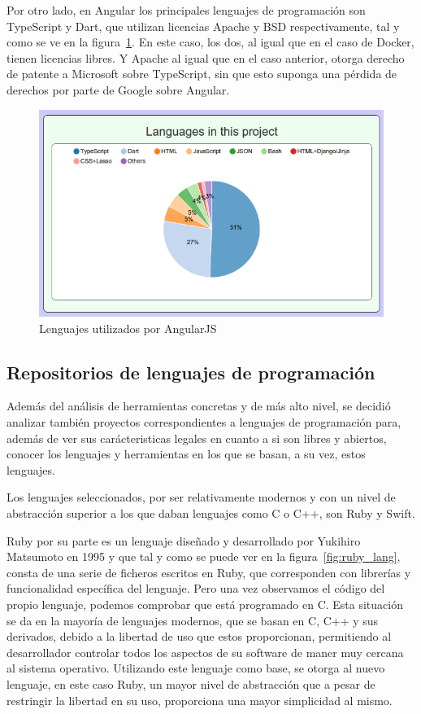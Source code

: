 \documentclass[a4paper, spanish, 12pt]{book}
\begin{document}
Por otro lado, en Angular los principales lenguajes de programaci\'on son TypeScript y Dart, que utilizan licencias Apache
y BSD respectivamente, tal y como se ve en la figura~\ref{fig:angular_lang}. En este caso, los dos, al igual que en el caso de Docker,
tienen licencias libres. Y Apache al igual que en el caso anterior, otorga derecho de patente a Microsoft sobre TypeScript,
sin que esto suponga una p\'erdida de derechos por parte de Google sobre Angular.

\begin{figure}
  \centering
  \includegraphics[width=14cm, keepaspectratio]{img/languages_angular}
  \caption{Lenguajes utilizados por AngularJS}
  \label{fig:angular_lang}
\end{figure}

\subsection{Repositorios de lenguajes de programaci\'on}
\label{subsec:languages_repos}

Adem\'as del an\'alisis de herramientas concretas y de m\'as alto nivel, se decidi\'o analizar tambi\'en proyectos
correspondientes a lenguajes de programaci\'on para, adem\'as de ver sus car\'acteristicas legales en cuanto a
si son libres y abiertos, conocer los lenguajes y herramientas en los que se basan, a su vez, estos lenguajes.

Los lenguajes seleccionados, por ser relativamente modernos y con un nivel de abstracci\'on superior a los que daban
lenguajes como C o C++, son Ruby y Swift.

Ruby por su parte es un lenguaje dise\~nado y desarrollado por Yukihiro Matsumoto en 1995 y que tal y como se puede ver
en la figura~\ref{fig:ruby_lang}, consta de una serie de ficheros escritos en Ruby, que corresponden con librer\'ias y funcionalidad
espec\'ifica del lenguaje. Pero una vez observamos el c\'odigo del propio lenguaje, podemos comprobar que est\'a programado
en C. Esta situaci\'on se da en la mayor\'ia de lenguajes modernos, que se basan en C, C++ y sus derivados, debido
a la libertad de uso que estos proporcionan, permitiendo al desarrollador controlar todos los aspectos de su software
de maner muy cercana al sistema operativo.
Utilizando este lenguaje como base, se otorga al nuevo lenguaje, en este caso Ruby, un mayor nivel de abstracci\'on
que a pesar de restringir la libertad en su uso, proporciona una mayor simplicidad al mismo.
\end{document}
